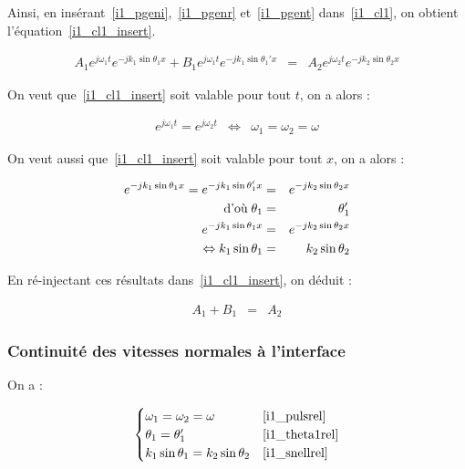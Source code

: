 Ainsi, en insérant~\eqref{i1_pgeni},~\eqref{i1_pgenr} et~\eqref{i1_pgent} dans~\eqref{i1_cl1}, on obtient
l'équation~\eqref{i1_cl1_insert}.

\begin{eqnarray}
    A_1e^{j\omega_1t}e^{-jk_1\sin\theta_1x} + B_1e^{j\omega_1t}e^{-jk_1\sin\theta_1'x} & = & A_2e^{j\omega_2t}e^{-jk_2\sin\theta_2x} \label{i1_cl1_insert}
\end{eqnarray}

On veut que~\eqref{i1_cl1_insert} soit valable pour tout $t$, on a alors :

\begin{eqnarray}
    e^{j\omega_1t} = e^{j\omega_2t} & \Leftrightarrow &\omega_1 = \omega_2 = \omega \label{i1_pulsrel}
\end{eqnarray}

On veut aussi que~\eqref{i1_cl1_insert} soit valable pour tout $x$, on a alors :

\begin{eqnarray}
    e^{-jk_1\sin\theta_1x} = e^{-jk_1\sin\theta_1'x} & = & e^{-jk_2\sin\theta_2x}\notag\\
    \text{d'où}\;\theta_1 & = & \theta_1'\label{i1_theta1rel}\\
    e^{-jk_1\sin\theta_1x} & = & e^{-jk_2\sin\theta_2x}\notag\\
    \Leftrightarrow k_1\sin\theta_1 & = & k_2\sin\theta_2 \label{i1_snellrel}
\end{eqnarray}

En ré-injectant ces résultats dans~\eqref{i1_cl1_insert}, on déduit :

\begin{eqnarray}
    A_1 + B_1 & = & A_2 \label{i1_amplirel}
\end{eqnarray}


\subsubsection{Continuité des vitesses normales à l'interface}

On a :

\begin{equation*}
    \begin{cases}
        \omega_1 = \omega_2 = \omega & \eqref{i1_pulsrel}\\
        \theta_1 = \theta_1' & \eqref{i1_theta1rel} \\
        k_1\sin\theta_1 = k_2\sin\theta_2  & \eqref{i1_snellrel}
    \end{cases}
\end{equation*}


